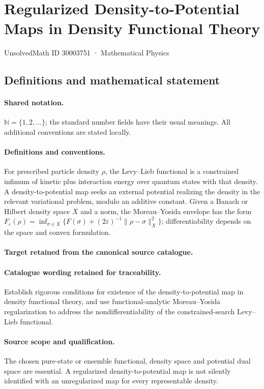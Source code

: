\documentclass[11pt]{article}
\begin{document}
\setcounter{section}{30003750}
\section{Regularized Density-to-Potential Maps in Density Functional Theory}\label{30003751}
{\small UnsolvedMath ID 30003751 · Mathematical Physics}
\subsection{Definitions and mathematical statement}

\paragraph{Shared notation.}$\mathbb N=\{1,2,\ldots\}$; the standard number fields have their usual meanings. All additional conventions are stated locally.


\paragraph{Definitions and conventions.}
For prescribed particle density $\rho$, the Levy--Lieb functional is a constrained infimum of kinetic plus interaction energy over quantum states with that density. A density-to-potential map seeks an external potential realizing the density in the relevant variational problem, modulo an additive constant. Given a Banach or Hilbert density space $X$ and a norm, the Moreau--Yosida envelope has the form $F_\varepsilon(\rho)=\inf_{\sigma\in X}\{F(\sigma)+(2\varepsilon)^{-1}\|\rho-\sigma\|_X^2\}$; differentiability depends on the space and convex formulation.

\paragraph{Target retained from the canonical source catalogue.}
\paragraph{Catalogue wording retained for traceability.}
Establish rigorous conditions for existence of the density-to-potential map in density functional theory, and use functional-analytic Moreau–Yosida regularization to address the nondifferentiability of the constrained-search Levy–Lieb functional.

\paragraph{Source scope and qualification.}
The chosen pure-state or ensemble functional, density space and potential dual space are essential. A regularized density-to-potential map is not silently identified with an unregularized map for every representable density.
\end{document}
